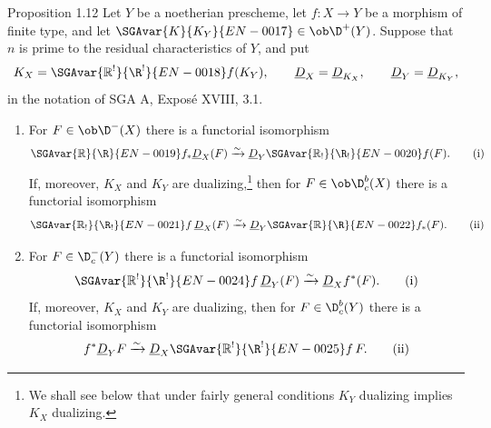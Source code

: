 \begin{statement}{Proposition 1.12}
Let $Y$ be a noetherian prescheme, let $f:X\to Y$ be a morphism of finite type, and let $\SGAvar{K}{K_Y}{EN-0017}\in\ob\D^+(Y)$. Suppose that $n$ is prime to the residual characteristics of $Y$, and put
\[
   K_X=\SGAvar{\mathbb{R}^!}{\R^!}{EN-0018}f(K_Y),\qquad \underline D_X=\underline D_{K_X},\qquad \underline D_Y=\underline D_{K_Y},
\]
in the notation of SGA A, Exposé XVIII, 3.1.
\begin{enumerate}[label=\alph*)]
\item For $F\in\ob\D^-(X)$ there is a functorial isomorphism
\begin{equation}
\SGAvar{\mathbb{R}}{\R}{EN-0019} f_*\underline D_X(F)\xrightarrow{\sim}\underline D_Y\SGAvar{\mathbb{R}_!}{\R_!}{EN-0020}f(F).\tag{i}
\end{equation}
If, moreover, $K_X$ and $K_Y$ are dualizing,\footnote{We shall see below that under fairly general conditions $K_Y$ dualizing implies $K_X$ dualizing.} then for $F\in\ob\D_c^b(X)$ there is a functorial isomorphism
\begin{equation}
\SGAvar{\mathbb{R}_!}{\R_!}{EN-0021}f\,\underline D_X(F)\xrightarrow{\sim}\underline D_Y\SGAvar{\mathbb{R}}{\R}{EN-0022} f_*(F).\tag{ii}
\end{equation}

\item For $F\in\D_c^-(Y)$ there is a functorial isomorphism
\begin{equation}
\SGAvar{\mathbb{R}^!}{\R^!}{EN-0024}f\,\underline D_Y(F)\xrightarrow{\sim}\underline D_X f^*(F).\tag{i}
\end{equation}
If, moreover, $K_X$ and $K_Y$ are dualizing, then for $F\in\D_c^b(Y)$ there is a functorial isomorphism
\begin{equation}
f^*\underline D_YF\xrightarrow{\sim}\underline D_X\SGAvar{\mathbb{R}^!}{\R^!}{EN-0025}f\,F.\tag{ii}
\end{equation}
\end{enumerate}
\end{statement}

